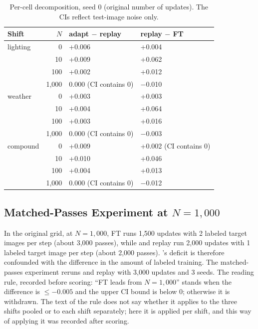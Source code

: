 \begin{table}[t]
\centering
\caption{Per-cell decomposition, seed 0 (original number of updates). The CIs reflect test-image noise only.}
\label{tab:cells}
\footnotesize
\setlength{\tabcolsep}{3pt}
\begin{tabular}{@{}lrll@{}}
\toprule
Shift & $N$ & adapt $-$ replay & replay $-$ FT \\
\midrule
lighting & 0 & +0.006 & +0.004 \\
 & 10 & +0.009 & +0.062 \\
 & 100 & +0.002 & +0.012 \\
 & 1,000 & 0.000 (CI contains 0) & $-$0.010 \\
\addlinespace[2pt]
weather & 0 & +0.003 & +0.003 \\
 & 10 & +0.004 & +0.064 \\
 & 100 & +0.003 & +0.016 \\
 & 1,000 & 0.000 (CI contains 0) & $-$0.003 \\
\addlinespace[2pt]
compound & 0 & +0.009 & +0.002 (CI contains 0) \\
 & 10 & +0.010 & +0.046 \\
 & 100 & +0.004 & +0.013 \\
 & 1,000 & 0.000 (CI contains 0) & $-$0.012 \\
\bottomrule
\end{tabular}
\end{table}

\subsection{Matched-Passes Experiment at \texorpdfstring{$N = 1{,}000$}{N = 1,000}}\label{sec:matched}

In the original grid, at $N = 1{,}000$, FT runs 1,500 updates with 2 labeled target images per step (about 3,000 passes), while \aldi and replay run 2,000 updates with 1 labeled target image per step (about 2,000 passes). \aldi's deficit is therefore confounded with the difference in the amount of labeled training. The matched-passes experiment reruns \aldi and replay with 3,000 updates and 3 seeds. The reading rule, recorded before scoring: ``FT leads from $N = 1{,}000$'' stands when the difference is $\leq -0.005$ and the upper CI bound is below 0; otherwise it is withdrawn. The text of the rule does not say whether it applies to the three shifts pooled or to each shift separately; here it is applied per shift, and this way of applying it was recorded after scoring.

